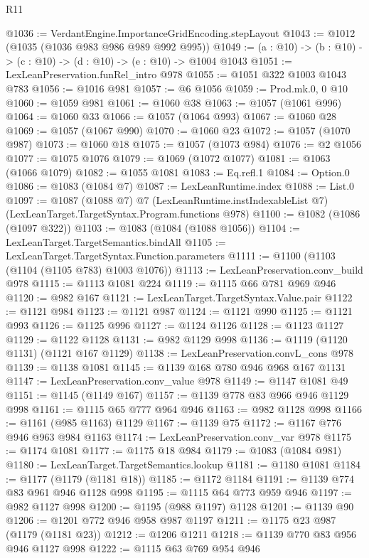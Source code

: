 \begin{lexlean}{R11}
\begin{coremodule}
@1036 := VerdantEngine.ImportanceGridEncoding.stepLayout
@1043 := @1012 (@1035 (@1036 @983 @986 @989 @992 @995))
@1049 := (a : @10) -> (b : @10) -> (c : @10) -> (d : @10) -> (e : @10) -> @1004 @1043
@1051 := LexLeanPreservation.funRel_intro @978
@1055 := @1051 @322 @1003 @1043 @783
@1056 := @1016 @981
@1057 := @6 @1056
@1059 := Prod.mk.{0, 0} @10
@1060 := @1059 @981
@1061 := @1060 @38
@1063 := @1057 (@1061 @996)
@1064 := @1060 @33
@1066 := @1057 (@1064 @993)
@1067 := @1060 @28
@1069 := @1057 (@1067 @990)
@1070 := @1060 @23
@1072 := @1057 (@1070 @987)
@1073 := @1060 @18
@1075 := @1057 (@1073 @984)
@1076 := @2 @1056
@1077 := @1075 @1076
@1079 := @1069 (@1072 @1077)
@1081 := @1063 (@1066 @1079)
@1082 := @1055 @1081
@1083 := Eq.refl.{1}
@1084 := Option.{0}
@1086 := @1083 (@1084 @7)
@1087 := LexLeanRuntime.index
@1088 := List.{0}
@1097 := @1087
    (@1088 @7)
    @7
    (LexLeanRuntime.instIndexableList @7)
    (LexLeanTarget.TargetSyntax.Program.functions @978)
@1100 := @1082 (@1086 (@1097 @322))
@1103 := @1083 (@1084 (@1088 @1056))
@1104 := LexLeanTarget.TargetSemantics.bindAll
@1105 := LexLeanTarget.TargetSyntax.Function.parameters
@1111 := @1100 (@1103 (@1104 (@1105 @783) @1003 @1076))
@1113 := LexLeanPreservation.conv_build @978
@1115 := @1113 @1081 @224
@1119 := @1115 @66 @781 @969 @946
@1120 := @982 @167
@1121 := LexLeanTarget.TargetSyntax.Value.pair
@1122 := @1121 @984
@1123 := @1121 @987
@1124 := @1121 @990
@1125 := @1121 @993
@1126 := @1125 @996
@1127 := @1124 @1126
@1128 := @1123 @1127
@1129 := @1122 @1128
@1131 := @982 @1129 @998
@1136 := @1119 (@1120 @1131) (@1121 @167 @1129)
@1138 := LexLeanPreservation.convL_cons @978
@1139 := @1138 @1081
@1145 := @1139 @168 @780 @946 @968 @167 @1131
@1147 := LexLeanPreservation.conv_value @978
@1149 := @1147 @1081 @49
@1151 := @1145 (@1149 @167)
@1157 := @1139 @778 @83 @966 @946 @1129 @998
@1161 := @1115 @65 @777 @964 @946
@1163 := @982 @1128 @998
@1166 := @1161 (@985 @1163) @1129
@1167 := @1139 @75
@1172 := @1167 @776 @946 @963 @984 @1163
@1174 := LexLeanPreservation.conv_var @978
@1175 := @1174 @1081
@1177 := @1175 @18 @984
@1179 := @1083 (@1084 @981)
@1180 := LexLeanTarget.TargetSemantics.lookup
@1181 := @1180 @1081
@1184 := @1177 (@1179 (@1181 @18))
@1185 := @1172 @1184
@1191 := @1139 @774 @83 @961 @946 @1128 @998
@1195 := @1115 @64 @773 @959 @946
@1197 := @982 @1127 @998
@1200 := @1195 (@988 @1197) @1128
@1201 := @1139 @90
@1206 := @1201 @772 @946 @958 @987 @1197
@1211 := @1175 @23 @987 (@1179 (@1181 @23))
@1212 := @1206 @1211
@1218 := @1139 @770 @83 @956 @946 @1127 @998
@1222 := @1115 @63 @769 @954 @946

\end{coremodule}
\end{lexlean}
